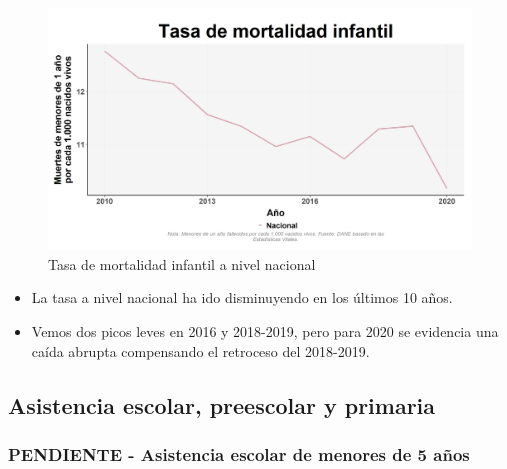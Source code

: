     \begin{figure}[H]
        \caption{Tasa de mortalidad infantil a nivel nacional \label{map_result_2} }
        \begin{center}
        \includegraphics[width=\textwidth,keepaspectratio]{img/var_291_trend.png}
        \end{center}
    \end{figure}
            \begin{itemize}
                    \item La tasa a nivel nacional ha ido disminuyendo en los últimos 10 años.
                    \item Vemos dos picos leves en 2016 y 2018-2019, pero para 2020 se evidencia una caída abrupta compensando el retroceso del 2018-2019.
                \end{itemize}

    \subsection{Asistencia escolar, preescolar y primaria}
        \subsubsection{PENDIENTE - Asistencia escolar de menores de 5 años}

